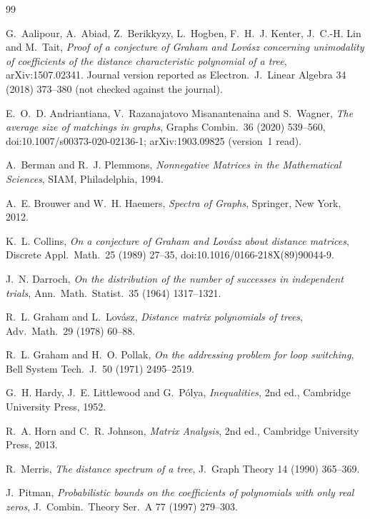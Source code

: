 \documentclass[11pt]{amsart}
\theoremstyle{definition}
\theoremstyle{remark}
\begin{document}
\begin{thebibliography}{99}

G.~Aalipour, A.~Abiad, Z.~Berikkyzy, L.~Hogben, F.~H.~J. Kenter, J.~C.-H. Lin
and M.~Tait, \emph{Proof of a conjecture of Graham and Lov\'asz concerning
unimodality of coefficients of the distance characteristic polynomial of a
tree}, arXiv:1507.02341. Journal version reported as Electron.\ J.\ Linear
Algebra 34 (2018) 373--380 (not checked against the journal).

E.~O.~D. Andriantiana, V.~Razanajatovo Misanantenaina and S.~Wagner,
\emph{The average size of matchings in graphs}, Graphs Combin.\ 36 (2020)
539--560, doi:10.1007/s00373-020-02136-1; arXiv:1903.09825 (version~1 read).

A.~Berman and R.~J. Plemmons, \emph{Nonnegative Matrices in the
Mathematical Sciences}, SIAM, Philadelphia, 1994.

A.~E. Brouwer and W.~H. Haemers, \emph{Spectra of Graphs}, Springer, New
York, 2012.

K.~L. Collins, \emph{On a conjecture of Graham and Lov\'asz about distance
matrices}, Discrete Appl.\ Math.\ 25 (1989) 27--35,
doi:10.1016/0166-218X(89)90044-9.

J.~N. Darroch, \emph{On the distribution of the number of successes in
independent trials}, Ann.\ Math.\ Statist.\ 35 (1964) 1317--1321.

R.~L. Graham and L.~Lov\'asz, \emph{Distance matrix polynomials of trees},
Adv.\ Math.\ 29 (1978) 60--88.

R.~L. Graham and H.~O. Pollak, \emph{On the addressing problem for loop
switching}, Bell System Tech.\ J.\ 50 (1971) 2495--2519.

G.~H. Hardy, J.~E. Littlewood and G.~P\'olya, \emph{Inequalities}, 2nd ed.,
Cambridge University Press, 1952.

R.~A. Horn and C.~R. Johnson, \emph{Matrix Analysis}, 2nd ed., Cambridge
University Press, 2013.

R.~Merris, \emph{The distance spectrum of a tree}, J.\ Graph Theory 14
(1990) 365--369.

J.~Pitman, \emph{Probabilistic bounds on the coefficients of polynomials
with only real zeros}, J.\ Combin.\ Theory Ser.\ A 77 (1997) 279--303.

\end{thebibliography}
\end{document}
